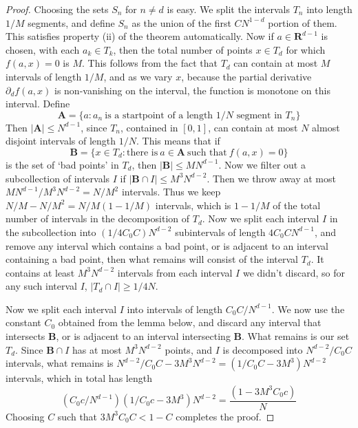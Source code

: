 \documentclass{report}
\theoremstyle{plain}
\theoremstyle{plain}
\begin{document}
\begin{proof}
    Choosing the sets $S_n$ for $n \neq d$ is easy. We split the intervals $T_n$ into length $1/M$ segments, and define $S_n$ as the union of the first $CN^{1-d}$ portion of them. This satisfies property (ii) of the theorem automatically. Now if $a \in \mathbf{R}^{d-1}$ is chosen, with each $a_k \in T_k$, then the total number of points $x \in T_d$ for which $f(a,x) = 0$ is $M$. This follows from the fact that $T_d$ can contain at most $M$ intervals of length $1/M$, and as we vary $x$, because the partial derivative $\partial_d f(a,x)$ is non-vanishing on the interval, the function is monotone on this interval. Define
    \[ \mathbf{A} = \{ a: a_n\ \text{is a startpoint of a length $1/N$ segment in $T_n$} \} \]
    Then $|\mathbf{A}| \leq N^{d-1}$, since $T_n$, contained in $[0,1]$, can contain at most $N$ almost disjoint intervals of length $1/N$. This means that if
    \[ \mathbf{B} = \{ x \in T_d: \text{there is}\ a \in \mathbf{A}\ \text{such that}\ f(a,x) = 0 \} \]
    is the set of `bad points' in $T_d$, then $|\mathbf{B}| \leq MN^{d-1}$. Now we filter out a subcollection of intervals $I$ if $|\mathbf{B} \cap I| \leq M^3N^{d-2}$. Then we throw away at most $MN^{d-1}/M^3N^{d-2} = N/M^2$ intervals. Thus we keep $N/M - N/M^2 = N/M(1 - 1/M)$ intervals, which is $1 - 1/M$ of the total number of intervals in the decomposition of $T_d$. Now we split each interval $I$ in the subcollection into $(1/4C_0C) N^{d-2}$ subintervals of length $4C_0 C N^{d-1}$, and remove any interval which contains a bad point, or is adjacent to an interval containing a bad point, then what remains will consist of the  interval $T_d$. It contains at least $M^3 N^{d-2}$ intervals from each interval $I$ we didn't discard, so for any such interval $I$, $|T_d \cap I| \geq 1/4N$.

    Now we split each interval $I$ into intervals of length $C_0C / N^{d-1}$. We now use the constant $C_0$ obtained from the lemma below, and discard any interval that intersects $\mathbf{B}$, or is adjacent to an interval intersecting $\mathbf{B}$. What remains is our set $T_d$. Since $\mathbf{B} \cap I$ has at most $M^3N^{d-2}$ points, and $I$ is decomposed into $N^{d-2}/C_0C$ intervals, what remains is $N^{d-2}/C_0C - 3M^3N^{d-2} = (1/C_0C - 3M^3)N^{d-2}$ intervals, which in total has length
    \[ (C_0c/N^{d-1}) (1/C_0c - 3M^3)N^{d-2} = \frac{(1 - 3M^3 C_0c)}{N} \]
    Choosing $C$ such that $3M^3C_0C < 1 - C$ completes the proof.
\end{proof}
\end{document}
